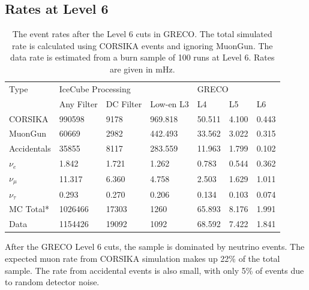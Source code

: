 \subsection{Rates at Level 6}
\begin{table}[]
\centering
\begin{tabular}{@{}lllllll@{}}
\toprule
Type         & \multicolumn{3}{l}{IceCube Processing} & \multicolumn{3}{l}{GRECO} \\
             & Any Filter   & DC Filter  & Low-en L3  & L4      & L5     & L6     \\ \midrule
CORSIKA      & 990598       & 9178       & 969.818    & 50.511  & 4.100  & 0.443  \\
MuonGun      & 60669        & 2982       & 442.493    & 33.562  & 3.022  & 0.315  \\
Accidentals  & 35855        & 8117       & 283.559    & 11.963  & 1.799  & 0.102  \\
$\nu_e$      & 1.842        & 1.721      & 1.262      & 0.783   & 0.544  & 0.362  \\
$\nu_{\mu}$  & 11.317       & 6.360      & 4.758      & 2.503   & 1.629  & 1.011  \\
$\nu_{\tau}$ & 0.293        & 0.270      & 0.206      & 0.134   & 0.103  & 0.074  \\ \midrule
MC Total*    & 1026466      & 17303      & 1260       & 65.893  & 8.176  & 1.991  \\
Data         & 1154426      & 19092      & 1092       & 68.592  & 7.422  & 1.841  \\ \bottomrule
\end{tabular}
\caption{The event rates after the Level 6 cuts in GRECO.  The total simulated rate is calculated using CORSIKA events and ignoring MuonGun. The data rate is estimated from a burn sample of 100 runs at Level 6. Rates are given in mHz.}
\label{tab:event_rates_L5}
\end{table}

After the GRECO Level 6 cuts, the sample is dominated by neutrino events.
The expected muon rate from CORSIKA simulation makes up 22\% of the total sample.
The rate from accidental events is also small, with only 5\% of events due to random detector noise.











\graphicspath{{chapters/greco/images/level7/}}
\label{sec:level7}
\graphicspath{{chapters/greco/images/level7/}}

